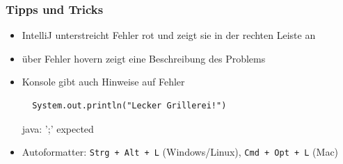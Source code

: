\documentclass{../../presentation}
\begin{document}

\begin{frame}[fragile]
	\frametitle{Tipps und Tricks}
	\pause
	\begin{itemize}
		\item IntelliJ unterstreicht Fehler rot und zeigt sie in der rechten Leiste an
		      \pause
		\item über Fehler hovern zeigt eine Beschreibung des Problems
		      \pause
		\item Konsole gibt auch Hinweise auf Fehler \newline
		      \begin{verbatim}
  System.out.println("Lecker Grillerei!")
  			\end{verbatim}
		      \begin{ausgabe}
			      \color{red}java: ';' expected
		      \end{ausgabe}
		      \pause
		\item Autoformatter: \texttt{Strg + Alt + L} (Windows/Linux), \texttt{Cmd + Opt + L} (Mac)
	\end{itemize}

\end{frame}

\renewcommand{\feedbackurl}{\vkFeedbackUrlDayOne}

\end{document}
